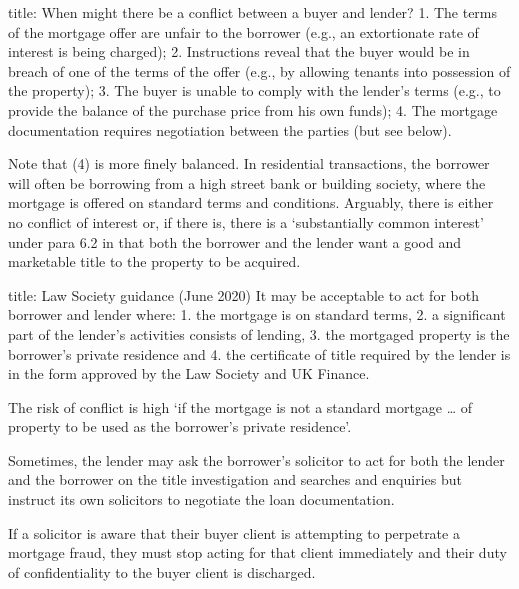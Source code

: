 \documentclass[
]{article}
\newenvironment{Shaded}{}{}
\newcommand{\NormalTok}[1]{#1}
\begin{document}
\begin{Shaded}
\begin{Highlighting}[]
\NormalTok{title: When might there be a conflict between a buyer and lender?}
\NormalTok{1. The terms of the mortgage offer are unfair to the borrower (e.g., an extortionate rate of interest is being charged);}
\NormalTok{2. Instructions reveal that the buyer would be in breach of one of the terms of the offer (e.g., by allowing tenants into possession of the property);}
\NormalTok{3. The buyer is unable to comply with the lender’s terms (e.g., to provide the balance of the purchase price from his own funds);}
\NormalTok{4. The mortgage documentation requires negotiation between the parties (but see below). }
\end{Highlighting}
\end{Shaded}

Note that (4) is more finely balanced. In residential transactions, the
borrower will often be borrowing from a high street bank or building
society, where the mortgage is offered on standard terms and conditions.
Arguably, there is either no conflict of interest or, if there is, there
is a `substantially common interest' under para 6.2 in that both the
borrower and the lender want a good and marketable title to the property
to be acquired.

\begin{Shaded}
\begin{Highlighting}[]
\NormalTok{title: Law Society guidance (June 2020) }
\NormalTok{It may be acceptable to act for both borrower and lender where:}
\NormalTok{1. the mortgage is on standard terms, }
\NormalTok{2. a significant part of the lender’s activities consists of lending, }
\NormalTok{3. the mortgaged property is the borrower’s private residence and }
\NormalTok{4. the certificate of title required by the lender is in the form approved by the Law Society and UK Finance.}

\NormalTok{The risk of conflict is high ‘if the mortgage is not a standard mortgage … of property to be used as the borrower’s private residence’.}
\end{Highlighting}
\end{Shaded}

Sometimes, the lender may ask the borrower's solicitor to act for both
the lender and the borrower on the title investigation and searches and
enquiries but instruct its own solicitors to negotiate the loan
documentation.

\begin{Shaded}
\begin{Highlighting}[]
\NormalTok{If a solicitor is aware that their buyer client is attempting to perpetrate a mortgage fraud, they must stop acting for that client immediately and their duty of confidentiality to the buyer client is discharged. }
\end{Highlighting}
\end{Shaded}
\end{document}
